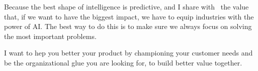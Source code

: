 Because the best shape of intelligence is predictive, and I share with \companyName \ the value that, if we want to have the biggest impact, we have to equip industries with the power of AI. The best way to do this is to make sure we always focus on solving the most important problems. 

I want to hep you better your product by championing your customer needs and be the organizational glue you are looking for, to build better value together.